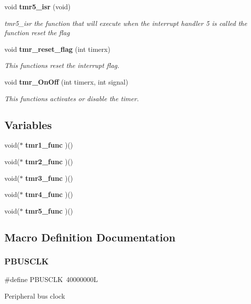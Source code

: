 \begin{DoxyCompactItemize}
void \textbf{ tmr5\+\_\+isr} (void)
\begin{DoxyCompactList}\small\item\em tmr5\+\_\+isr the function that will execute when the interrupt handler 5 is called the function reset the flag \end{DoxyCompactList}\item 
void \textbf{ tmr\+\_\+reset\+\_\+flag} (int timerx)
\begin{DoxyCompactList}\small\item\em This functions reset the interrupt flag. \end{DoxyCompactList}\item 
void \textbf{ tmr\+\_\+\+On\+Off} (int timerx, int signal)
\begin{DoxyCompactList}\small\item\em This functions activates or disable the timer. \end{DoxyCompactList}\end{DoxyCompactItemize}
\subsection*{Variables}
\begin{DoxyCompactItemize}
\item 
void($\ast$ \textbf{ tmr1\+\_\+func} )()
\item 
void($\ast$ \textbf{ tmr2\+\_\+func} )()
\item 
void($\ast$ \textbf{ tmr3\+\_\+func} )()
\item 
void($\ast$ \textbf{ tmr4\+\_\+func} )()
\item 
void($\ast$ \textbf{ tmr5\+\_\+func} )()
\end{DoxyCompactItemize}


\subsection{Macro Definition Documentation}
\mbox{\label{_timer__libs_8c_afea81b612c0d335d1bd49be68c1a89d3}} 
\subsubsection{P\+B\+U\+S\+C\+LK}
{\footnotesize\ttfamily \#define P\+B\+U\+S\+C\+LK~40000000L}

Peripheral bus clock \mbox{\label{_timer__libs_8c_a97ee8be60ff9ae1cfface03bc50f1d94}} 
